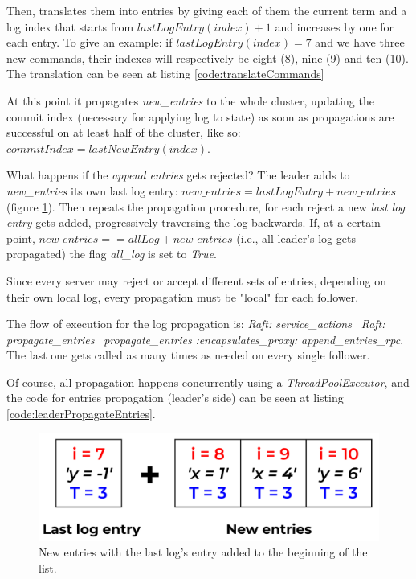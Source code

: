 Then, translates them into entries by giving each of them the current term and a log index that starts from $lastLogEntry(index) + 1$ and increases by one for each entry. To give an example: if $lastLogEntry(index) = 7$ and we have three new commands, their indexes will respectively be eight (8), nine (9) and ten (10). The translation can be seen at listing \ref{code:translateCommands}

At this point it propagates \textit{new\_entries} to the whole cluster, updating the commit index (necessary for applying log to state) as soon as propagations are successful on at least half of the cluster, like so: $commitIndex = lastNewEntry(index)$. 

What happens if the \textit{append entries} gets rejected? The leader adds to \textit{new\_entries} its own last log entry: $new\_entries = lastLogEntry + new\_entries$ (figure \ref{fig:newEntries}). Then repeats the propagation procedure, for each reject a new \textit{last log entry} gets added, progressively traversing the log backwards. If, at a certain point, $new\_entries == allLog + new\_entries$ (i.e., all leader's log gets propagated) the flag \textit{all\_log} is set to \textit{True}. 

Since every server may reject or accept different sets of entries, depending on their own local log, every propagation must be "local" for each follower. 

The flow of execution for the log propagation is: \textit{Raft: service\_actions} \faArrowRight\ \textit{Raft: propagate\_entries} \faArrowRight\ \textit{propagate\_entries} \textit{:encapsulates\_proxy:} \textit{append\_entries\_rpc}. The last one gets called as many times as needed on every single follower.

Of course, all propagation happens concurrently using a \textit{ThreadPoolExecutor}, and the code for entries propagation (leader's side) can be seen at listing \ref{code:leaderPropagateEntries}.

\begin{figure}[h]
  \centering
  \includegraphics[width=.8\linewidth]{images/newEntries.png}
  
  \caption{New entries with the last log's entry added to the beginning of the list.}
  \label{fig:newEntries}
\end{figure}

